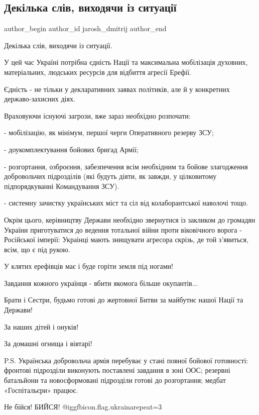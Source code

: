  
 
 
 
 
 
\subsection{Декілька слів, виходячи із ситуації}
\label{sec:20_02_2022.fb.jarosh_dmitrij.1.dekilka_sliv}
 
\ifcmt
 author_begin
   author_id jarosh_dmitrij
 author_end
\fi

Декілька слів, виходячи із ситуації.

У цей час Україні потрібна єдність Нації та максимальна мобілізація духовних,
матеріальних, людських ресурсів для відбиття агресії Ерефії.

Єдність - не тільки у декларативних заявах політиків, але й у конкретних
державо-захисних діях.

Враховуючи існуючі загрози, вже зараз необхідно розпочати:

- мобілізацію, як мінімум, першої черги Оперативного резерву ЗСУ; 

- доукомплектування бойових бригад Армії; 

- розгортання, озброєння, забезпечення всім необхідним та бойове злагодження
добровольчих підрозділів (які будуть діяти, як завжди, у цілковитому
підпорядкуванні Командування ЗСУ).

- системну зачистку українських міст та сіл від колаборантської наволочі тощо.

Окрім цього, керівництву Держави необхідно звернутися із закликом до громадян
України приготуватися до ведення тотальної війни проти віковічного ворога -
Російської імперії: Украінці мають знищувати агресора скрізь, де той з’явиться,
всім, що є під рукою. 

У клятих ерефівців має і буде горіти земля під ногами!

Завдання кожного українця - вбити якомога більше окупантів...

Брати і Сестри, будьмо готові до жертовної Битви за майбутнє нашої Нації та
Держави!

За наших дітей і онуків!

За домашні огнища і вівтарі!

P.S. Українська добровольча армія перебуває у стані повної бойової готовності:
фронтові підрозділи виконують поставлені завдання в зоні ООС; резервні
батальйони та новосформовані підрозділи готові до розгортання; медбат
«Госпітальєри» працює. 

Не бійся! БИЙСЯ! @igg{fbicon.flag.ukraina}{repeat=3}
